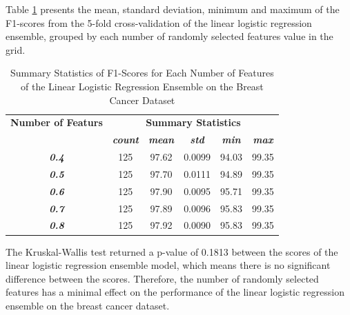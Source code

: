 \documentclass[10pt, conference]{IEEEtran}
\begin{document}
Table \ref{table: BC_features_linear_performance_metrics} presents the mean, standard deviation, minimum and maximum of the
F1-scores from the 5-fold cross-validation of the linear logistic regression ensemble, grouped by each number of randomly selected
features value in the grid.
\begin{table}[H]
    \caption{Summary Statistics of F1-Scores for Each Number of Features of the Linear Logistic Regression Ensemble on the Breast Cancer Dataset}
    \begin{center}
        \begin{tabular}{|c||c|c|c|c|c|}
            \hline
            \textbf{Number of Featurs}&\multicolumn{5}{|c|}{\textbf{Summary Statistics}} \\
            \cline{2-6}
                       &\textbf{\textit{count}} & \textbf{\textit{mean}} & \textbf{\textit{std}} & \textbf{\textit{min}} & \textbf{\textit{max}}\\
            \hline
            \textbf{\textit{0.4}} & 125 & 97.62 & 0.0099 & 94.03 & 99.35 \\
            \textbf{\textit{0.5}} & 125 & 97.70 & 0.0111 & 94.89 & 99.35 \\
            \textbf{\textit{0.6}} & 125 & 97.90 & 0.0095 & 95.71 & 99.35 \\
            \textbf{\textit{0.7}} & 125 & 97.89 & 0.0096 & 95.83 & 99.35 \\
            \textbf{\textit{0.8}} & 125 & 97.92 & 0.0090 & 95.83 & 99.35 \\
            \hline
        \end{tabular}
    \end{center}
    \label{table: BC_features_linear_performance_metrics}
\end{table}
The Kruskal-Wallis test returned a p-value of 0.1813 between the scores of the linear logistic regression ensemble model,
which means there is no significant difference between the scores. Therefore, the number of randomly selected
features has a minimal effect on the performance of the linear logistic regression ensemble on the breast cancer dataset.
\end{document}
